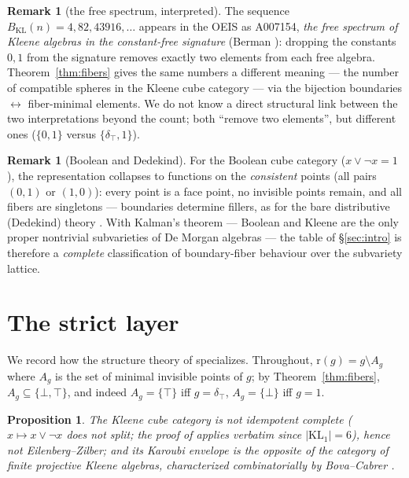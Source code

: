 \documentclass[11pt]{amsart}
\newtheorem{prop}[thm]{Proposition}
\theoremstyle{definition}
\newtheorem{rem}[thm]{Remark}
\newcommand{\KL}{\mathrm{KL}}
\newcommand{\rmin}{\mathrm{r}}
\begin{document}
\begin{rem}[the free spectrum, interpreted]
  \label{rem:spectrum}
  The sequence $B_{\KL}(n) = 4, 82, 43916, \dots$ appears in the
  OEIS as A007154, \emph{the free spectrum of Kleene algebras in
  the constant-free signature} (Berman \cite{Berman}): dropping the
  constants $0, 1$ from the signature removes exactly two elements
  from each free algebra.  Theorem~\ref{thm:fibers} gives the same
  numbers a different meaning --- the number of compatible spheres
  in the Kleene cube category --- via the bijection
  boundaries $\leftrightarrow$ fiber-minimal elements.  We do not
  know a direct structural link between the two interpretations
  beyond the count; both ``remove two elements'', but different
  ones ($\{0,1\}$ versus $\{\delta_\top, 1\}$).
\end{rem}

\begin{rem}[Boolean and Dedekind]
  \label{rem:boolean}
  For the Boolean cube category ($x \vee \neg x = 1$), the
  representation collapses to functions on the \emph{consistent}
  points (all pairs $(0,1)$ or $(1,0)$): every point is a face
  point, no invisible points remain, and all fibers are singletons
  --- boundaries determine fillers, as for the bare distributive
  (Dedekind) theory \cite{DMFibers}.  With Kalman's theorem
  \cite{Kalman} --- Boolean and Kleene are the only proper
  nontrivial subvarieties of De Morgan algebras --- the table of
  \S\ref{sec:intro} is therefore a \emph{complete} classification
  of boundary-fiber behaviour over the subvariety lattice.
\end{rem}

\section{The strict layer}
\label{sec:strict}

We record how the structure theory of \cite{StrictDM} specializes.
Throughout, $\rmin(g) = g \setminus A_g$ where $A_g$ is the set of
minimal invisible points of $g$; by Theorem~\ref{thm:fibers},
$A_g \subseteq \{\bot, \top\}$, and indeed
$A_g = \{\top\}$ iff $g = \delta_\top$, $A_g = \{\bot\}$ iff
$g = 1$.

\begin{prop}
  \label{prop:kar}
  The Kleene cube category is not idempotent complete
  ($x \mapsto x \vee \neg x$ does not split; the proof of
  \cite[Prop.~3.1]{StrictDM} applies verbatim since
  $|\KL_1| = 6$), hence not Eilenberg--Zilber; and its Karoubi
  envelope is the opposite of the category of finite projective
  Kleene algebras, characterized combinatorially by Bova--Cabrer
  \cite[Thm.~12]{BovaCabrer}.
\end{prop}
\end{document}
